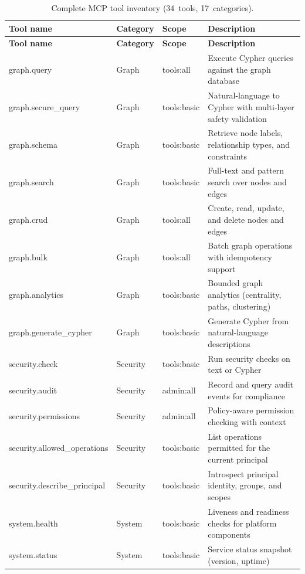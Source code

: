 \documentclass[a4paper]{sapthesis}
\begin{document}
{\footnotesize
\begin{longtable}{@{}l l l p{4.0cm}@{}}
\caption{Complete MCP tool inventory (34~tools, 17~categories).}
\label{tab:app-tool-inventory} \\
\hline
\textbf{Tool name} & \textbf{Category} & \textbf{Scope} &
    \textbf{Description} \\
\hline
\endfirsthead
\hline
\textbf{Tool name} & \textbf{Category} & \textbf{Scope} &
    \textbf{Description} \\
\hline
\endhead
\hline
\endfoot
graph.query          & Graph & tools:all   & Execute Cypher queries against the graph database \\
graph.secure\_query  & Graph & tools:basic & Natural-language to Cypher with multi-layer safety validation \\
graph.schema         & Graph & tools:basic & Retrieve node labels, relationship types, and constraints \\
graph.search         & Graph & tools:basic & Full-text and pattern search over nodes and edges \\
graph.crud           & Graph & tools:all   & Create, read, update, and delete nodes and edges \\
graph.bulk           & Graph & tools:all   & Batch graph operations with idempotency support \\
graph.analytics      & Graph & tools:basic & Bounded graph analytics (centrality, paths, clustering) \\
graph.generate\_cypher & Graph & tools:basic & Generate Cypher from natural-language descriptions \\
\hline
security.check              & Security & tools:basic & Run security checks on text or Cypher \\
security.audit              & Security & admin:all   & Record and query audit events for compliance \\
security.permissions        & Security & admin:all   & Policy-aware permission checking with context \\
security.allowed\_operations & Security & tools:basic & List operations permitted for the current principal \\
security.describe\_principal & Security & tools:basic & Introspect principal identity, groups, and scopes \\
\hline
system.health  & System & tools:basic & Liveness and readiness checks for platform components \\
system.status  & System & tools:basic & Service status snapshot (version, uptime) \\

\end{longtable}}
\end{document}
